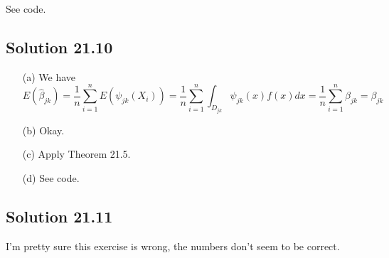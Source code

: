 See code.


\subsection*{Solution 21.10}

\begin{enumerate}
    \item[(a)] We have
        \begin{equation*}
            E(\hat{\beta}_{jk}) = \frac{1}{n} \sum_{i = 1}^n E(\psi_{jk}(X_i))
                = \frac{1}{n} \sum_{i = 1}^n \int_{D_{jk}} \psi_{jk}(x) f(x) dx
                = \frac{1}{n} \sum_{i = 1}^n \beta_{jk}
                = \beta_{jk}
        \end{equation*}
    \item[(b)] Okay.
    \item[(c)] Apply Theorem 21.5.
    \item[(d)] See code.
\end{enumerate}


\subsection*{Solution 21.11}

I'm pretty sure this exercise is wrong, the numbers don't seem to be correct.
